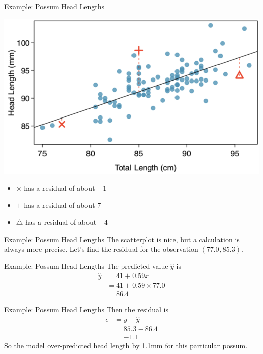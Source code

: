\begin{frame}{Example: Possum Head Lengths}
    \begin{center}
        \includegraphics[scale=0.3]{images/possreg.png}
    \end{center}
    \begin{itemize}
        \item $\times$ has a residual of about $-1$
        \item $+$ has a residual of about $7$
        \item $\bigtriangleup$ has a residual of about $-4$
    \end{itemize}
\end{frame}

\begin{frame}{Example: Possum Head Lengths}
    The scatterplot is nice, but a calculation is always more precise. Let's find the residual for the observation $(77.0, 85.3)$.
\end{frame}

\begin{frame}{Example: Possum Head Lengths}
    The predicted value $\hat{y}$ is
    \begin{align*}
        \hat{y} &= 41 + 0.59x \\
        &= 41 + 0.59 \times 77.0 \\
        &= 86.4
    \end{align*}
\end{frame}

\begin{frame}{Example: Possum Head Lengths}
    Then the residual is
    \begin{align*}
        e &= y - \hat{y} \\
            &= 85.3 - 86.4 \\
            &= -1.1
    \end{align*}
    So the model over-predicted head length by 1.1mm for this particular possum.
\end{frame}

